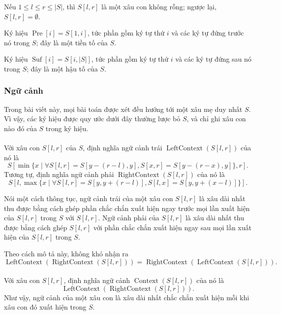 \documentclass[11pt]{article}
\begin{document}
Nếu \(1\le l\le r\le |S|\), thì \(S[l,r]\) là một xâu con không rỗng; ngược
lại, \(S[l,r]=\emptyset\).

Ký hiệu \(\operatorname{Pre}[i]=S[1,i]\), tức phần gồm ký tự thứ \(i\) và các ký
tự đứng trước nó trong \(S\); đây là một tiền tố của \(S\).

Ký hiệu \(\operatorname{Suf}[i]=S[i,|S|]\), tức phần gồm ký tự thứ \(i\) và các
ký tự đứng sau nó trong \(S\); đây là một hậu tố của \(S\).

\subsubsection{Ngữ cảnh}

Trong bài viết này, mọi bài toán được xét đều hướng tới một xâu mẹ duy nhất
\(S\). Vì vậy, các ký hiệu được quy ước dưới đây thường lược bỏ \(S\), và chỉ
ghi xâu con nào đó của \(S\) trong ký hiệu.

\paragraph{}
Với xâu con \(S[l,r]\) của \(S\), định nghĩa ngữ cảnh trái
\(\operatorname{LeftContext}(S[l,r])\) của nó là
\[
S\left[
\min\{x\mid \forall S[l,r]=S[y-(r-l),y],
S[x,r]=S[y-(r-x),y]\}, r
\right].
\]
Tương tự, định nghĩa ngữ cảnh phải \(\operatorname{RightContext}(S[l,r])\) của
nó là
\[
S\left[
l,\max\{x\mid \forall S[l,r]=S[y,y+(r-l)],
S[l,x]=S[y,y+(x-l)]\}
\right].
\]

Nói một cách thông tục, ngữ cảnh trái của một xâu con \(S[l,r]\) là xâu dài
nhất thu được bằng cách ghép phần chắc chắn xuất hiện ngay trước mọi lần xuất
hiện của \(S[l,r]\) trong \(S\) với \(S[l,r]\). Ngữ cảnh phải của \(S[l,r]\) là
xâu dài nhất thu được bằng cách ghép \(S[l,r]\) với phần chắc chắn xuất hiện
ngay sau mọi lần xuất hiện của \(S[l,r]\) trong \(S\).

Theo cách mô tả này, không khó nhận ra
\[
\operatorname{LeftContext}(\operatorname{RightContext}(S[l,r]))
=
\operatorname{RightContext}(\operatorname{LeftContext}(S[l,r])).
\]

\paragraph{}
Với xâu con \(S[l,r]\), định nghĩa ngữ cảnh
\(\operatorname{Context}(S[l,r])\) của nó là
\[
\operatorname{LeftContext}(\operatorname{RightContext}(S[l,r])).
\]
Như vậy, ngữ cảnh của một xâu con là xâu dài nhất chắc chắn xuất hiện mỗi khi
xâu con đó xuất hiện trong \(S\).
\end{document}
